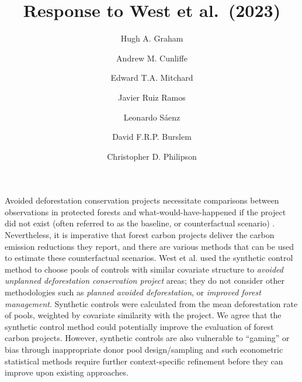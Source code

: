 \documentclass[
  number,
  3p]{elsarticle}
\begin{document}
\begin{frontmatter}
\title{Response to West et al.~(2023)}
\author[1,2]{Hugh A. Graham%
%
}
\author[2]{Andrew M. Cunliffe%
%
}

\author[3]{Edward T.A. Mitchard%
%
}

\author[1]{Javier Ruiz Ramos%
%
}

\author[1]{Leonardo Sáenz%
%
}

\author[4]{David F.R.P. Burslem%
%
}

\author[1]{Christopher D. Philipson%
%
}









        





\end{frontmatter}
    \ifdefined\Shaded\renewenvironment{Shaded}{\begin{tcolorbox}[boxrule=0pt, frame hidden, interior hidden, borderline west={3pt}{0pt}{shadecolor}, enhanced, breakable, sharp corners]}{\end{tcolorbox}}\fi

Avoided deforestation conservation projects necessitate comparisons
between observations in protected forests and what-would-have-happened
if the project did not exist (often referred to as the baseline, or
counterfactual scenario) \citep{balmford_realizing_2023}. Nevertheless,
it is imperative that forest carbon projects deliver the carbon emission
reductions they report, and there are various methods that can be used
to estimate these counterfactual scenarios. West et al.
\citep{west_action_2023} used the synthetic control method to choose
pools of controls with similar covariate structure to \emph{avoided
unplanned deforestation conservation project} areas; they do not
consider other methodologies such as \emph{planned avoided
deforestation}, or \emph{improved forest management}. Synthetic controls
were calculated from the mean deforestation rate of pools, weighted by
covariate similarity with the project. We agree that the synthetic
control method could potentially improve the evaluation of forest carbon
projects. However, synthetic controls are also vulnerable to ``gaming''
or bias through inappropriate donor pool design/sampling and such
econometric statistical methods require further context-specific
refinement \citep{balmford_realizing_2023} before they can improve upon
existing approaches.
\end{document}
